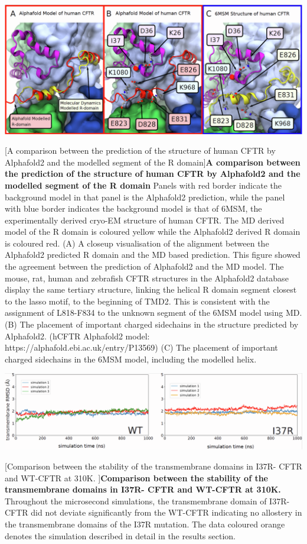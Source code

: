 \begin{center}
	\includegraphics[width=\textwidth]{figures/I37R/S7.png}
\label{I37R_S7}
\end{center}
\begingroup
{}[A comparison between the prediction of the structure of human CFTR by
Alphafold2 and the modelled segment of the R domain]{\textbf{A comparison between the prediction of the structure of human CFTR by Alphafold2 and the modelled segment of the R domain}}{
	Panels with red border indicate the background model in that panel is the Alphafold2 prediction, while the panel with blue border indicates the background model is that of 6MSM, the experimentally derived cryo-EM structure of human CFTR. The MD derived model of the R domain is coloured yellow while the Alphafold2 derived R domain is coloured red. (A) A closeup visualisation of the alignment between the Alphafold2 predicted R domain and the MD based prediction. This figure showed the agreement between the prediction of Alphafold2 and the MD model. The mouse, rat, human and zebrafish CFTR structures in the Alphafold2 database display the same tertiary structure, linking the helical R domain segment closest to the lasso motif, to the beginning of TMD2. This is consistent with the assignment of L818-F834 to the unknown segment of the 6MSM model using MD. (B) The placement of important charged sidechains in the structure predicted by Alphafold2. (hCFTR Alphafold2 model: https://alphafold.ebi.ac.uk/entry/P13569) (C) The placement of important charged sidechains in the 6MSM model, including the modelled helix.
}
\endgroup


\begin{center}
	\includegraphics[width=\textwidth]{figures/I37R/S8.png}
\label{I37R_S6}
\end{center}
\begingroup
{}[Comparison between the stability of the transmembrane domains in I37R-
CFTR and WT-CFTR at 310K. ]{\textbf{Comparison between the stability of the transmembrane domains in I37R-
	CFTR and WT-CFTR at 310K. }}{
	 Throughout the microsecond simulations, the transmembrane domain of I37R-CFTR did not deviate significantly from the WT-CFTR indicating no allostery in the transmembrane domains of the I37R mutation. The data coloured orange denotes the simulation described in detail in the results section.
 }
\endgroup

